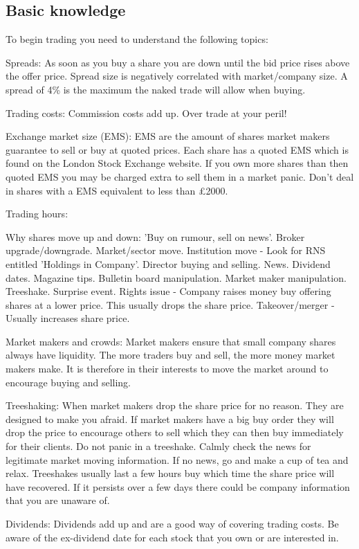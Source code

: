 \subsection*{Basic knowledge}
To begin trading you need to understand the following topics:
\begin{enumerate*}
\item Spreads: As soon as you buy a share you are down until the bid price rises above the offer price.
Spread size is negatively correlated with market/company size.
A spread of 4\% is the maximum the naked trade will allow when buying.
\item Trading costs: Commission costs add up. Over trade at your peril!
\item Exchange market size (EMS): EMS are the amount of shares market makers guarantee to sell or buy at quoted prices.
Each share has a quoted EMS which is found on the London Stock Exchange website. 
If you own more shares than then quoted EMS you may be charged extra to sell them in a market panic.
Don't deal in shares with a EMS equivalent to less than \pounds 2000.
\item Trading hours:
\item Why shares move up and down: 'Buy on rumour, sell on news'.
Broker upgrade/downgrade. 
Market/sector move.
Institution move - Look for RNS entitled 'Holdings in Company'.
Director buying and selling. News. Dividend dates. Magazine tips. Bulletin board manipulation. Market maker manipulation. Treeshake. Surprise event. 
Rights issue - Company raises money buy offering shares at a lower price. This usually drops the share price.
Takeover/merger - Usually increases share price. 
\item Market makers and crowds: Market makers ensure that small company shares always have liquidity.
The more traders buy and sell, the more money market makers make. 
It is therefore in their interests to move the market around to encourage buying and selling.
\item Treeshaking: When market makers drop the share price for no reason.
They are designed to make you afraid.
If market makers have a big buy order they will drop the price to encourage others to sell which they can then buy immediately for their clients.
Do not panic in a treeshake. Calmly check the news for legitimate market moving information.
If no news, go and make a cup of tea and relax.
Treeshakes usually last a few hours buy which time the share price will have recovered.
If it persists over a few days there could be company information that you are unaware of.
\item Dividends: Dividends add up and are a good way of covering trading costs.
Be aware of the ex-dividend date for each stock that you own or are interested in.
\end{enumerate*}

